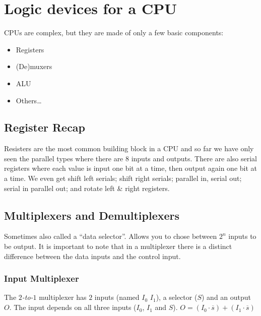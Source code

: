 \section{Logic devices for a CPU}\label{sec:logic_devices_for_a_cpu}

CPUs are complex, but they are made of only a few basic components:
\begin{itemize}
	\item Registers
	\item (De)muxers
	\item ALU
	\item Others\ldots
\end{itemize}

\subsection{Register Recap}\label{sub:register_recap}

Resisters are the most common building block in a CPU and so far we have only seen the parallel types where there are \(8\) inputs and outputs.
There are also serial registers where each value is input one bit at a time, then output again one bit at a time.
We even get shift left serials; shift right serials; parallel in, serial out; serial in parallel out; and rotate left \& right registers.

\subsection{Multiplexers and Demultiplexers}\label{sub:multiplexers_and_demultiplexers}

Sometimes also called a ``data selector''.
Allows you to chose between \(2^{n}\) inputs to be output.
It is important to note that in a multiplexer there is a distinct difference between the data inputs and the control input.

\subsubsection{Input Multiplexer}\label{ssub:input_multiplexer}

The \emph{\(2\)-to-\(1\)} multiplexer has \(2\) inputs (named \(I_0\) \(I_1\)), a selector (\(S\)) and an output \(O\).
The input depends on all three inputs (\(I_0\), \(I_1\) and \(S\)).
\(O = (I_0\cdot\overline{s}) + (I_1\cdot\overline{s})\)

